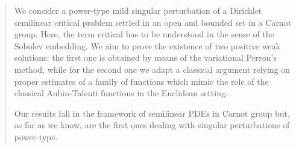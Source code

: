 \documentclass[11pt]{amsart}
\numberwithin{equation}{section} %
\theoremstyle{definition}
\begin{document}
 	
 
 \begin{abstract}
 	We consider a power-type mild singular perturbation of a Dirichlet semilinear critical problem settled
 	in an open and bounded set in a Carnot group. 
 	Here, the term critical has to be understood in the sense of the Sobolev embedding.
 	We aim to prove
 	the existence of two positive weak solutions: the first one is obtained
 	by means of the variational Perron's method, while  for the second
 	one we adapt a classical argument relying on proper estimates of 
 	a family of functions which mimic the role of the classical
 	Aubin-Talenti functions in the Euclidean setting.
 	
 	Our results fall in the framework of semilinear PDEs in Carnot group but,
 	as far as we know, are the first ones dealing with singular perturbations
 	of power-type.
 \end{abstract}	
 
 	
\maketitle
\end{document}
